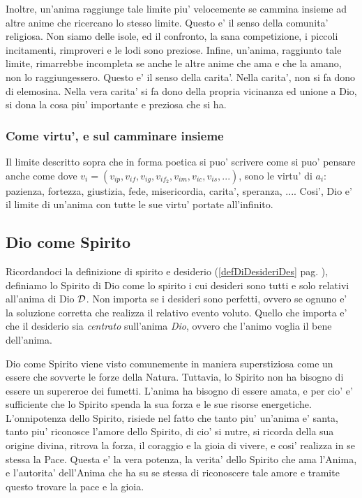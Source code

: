 Inoltre, un'anima raggiunge tale limite piu' velocemente se cammina insieme ad altre anime che ricercano lo stesso limite. Questo e' il senso della comunita' religiosa. Non siamo delle isole, ed il confronto, la sana competizione, i piccoli incitamenti, rimproveri e le lodi sono preziose. Infine, un'anima, raggiunto tale limite, rimarrebbe incompleta se anche le altre anime che ama e che la amano, non lo raggiungessero. Questo e' il senso della carita'.
Nella carita', non si fa dono di elemosina. Nella vera carita' si fa dono della propria vicinanza ed unione a Dio, si dona la cosa piu' importante e preziosa che si ha.

\subsubsection{Come virtu', e sul camminare insieme}
Il limite descritto sopra
che in forma poetica si puo' scrivere come
si puo' pensare anche come 
dove $v_i=(v_{ip},v_{if},v_{ig},v_{if_2},v_{im},v_{ic},v_{is},...)$, sono le virtu' di $a_i$: pazienza, fortezza, giustizia, fede, misericordia, carita', speranza, .... Cosi', Dio e' il limite di un'anima con tutte le sue virtu' portate all'infinito.


\subsection{Dio come Spirito}
\label{DioComeSpirito}

Ricordandoci la definizione di spirito e desiderio (\ref{defDiDesideriDes} pag. \pageref{defDiDesideriDes}), definiamo lo Spirito di Dio come lo spirito i cui desideri sono tutti e solo relativi all'anima di Dio $\mathcal{D}$. Non importa se i desideri sono perfetti, ovvero se ognuno e' la soluzione corretta che realizza il relativo evento voluto. Quello che importa e' che il desiderio sia \emph{centrato} sull'anima \emph{Dio}, ovvero che l'animo voglia il bene dell'anima.

    Dio come Spirito viene visto comunemente in maniera superstiziosa come un essere che sovverte le forze della Natura. Tuttavia, lo Spirito non ha bisogno di essere un supereroe dei fumetti. L'anima ha bisogno di essere amata, e per cio' e' sufficiente che lo Spirito spenda la sua forza e le sue risorse energetiche. L'onnipotenza dello Spirito, risiede nel fatto che tanto piu' un'anima e' santa, tanto piu' riconosce l'amore dello Spirito, di cio' si nutre, si ricorda della sua origine divina, ritrova la forza, il coraggio e la gioia di vivere, e cosi' realizza in se stessa la Pace.  Questa e' la vera potenza, la verita' dello Spirito che ama l'Anima, e l'autorita' dell'Anima che ha su se stessa di riconoscere tale amore e tramite questo trovare la pace e la gioia.

